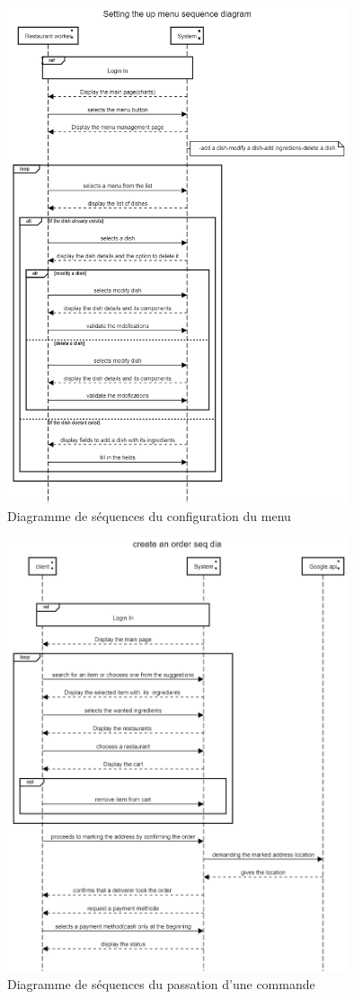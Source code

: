 \documentclass[french, a4paper, 12pt]{report}
\begin{document}
			\newpage	
			\begin{figure}[!h]
  				\center
  				\includegraphics[width=10cm]{seqmenu.png}
  				\caption{Diagramme de séquences du configuration du menu}
  				\label{fig:seqmenu}
			\end{figure}
			
			\newpage	
			\begin{figure}[!h]
  				\center
  				\includegraphics[width=10cm]{seqorder.png}
  				\caption{Diagramme de séquences du passation d'une commande}
  				\label{fig:seqorder}
			\end{figure}
			
\end{document}
